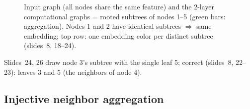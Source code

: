 \begin{figure}[htbp]
  \caption{Input graph (all nodes share the same feature) and the 2-layer
  computational graphs = rooted subtrees of nodes 1--5 (green bars: aggregation).
  Nodes 1 and 2 have identical subtrees $\Rightarrow$ same embedding; top row: one
  embedding color per distinct subtree (slides~8, 18--24).}
  \label{fig:lec06-subtrees}
\end{figure}

\begin{caution}
  Slides~24, 26 draw node 3's subtree with the single leaf 5; correct (slides~8,
  22--23): leaves 3 and 5 (the neighbors of node 4).
\end{caution}

\subsection{Injective neighbor aggregation}\label{sec:lec06-injective}

